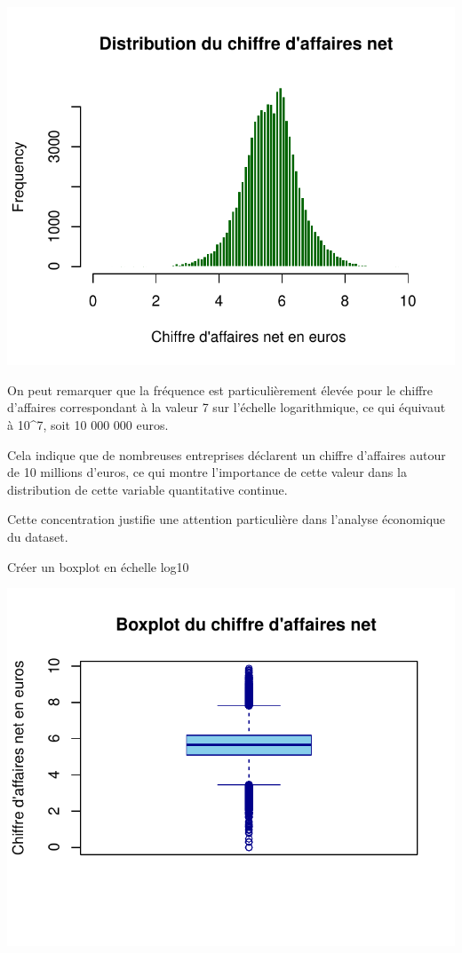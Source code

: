 \documentclass[mstat,12pt]{unswthesis}
\begin{document}
\medskip

\includegraphics{TDDT_projet_L_2_files/figure-latex/unnamed-chunk-40-1.pdf}

\medskip

On peut remarquer que la fréquence est particulièrement élevée pour le
chiffre d'affaires correspondant à la valeur 7 sur l'échelle
logarithmique, ce qui équivaut à 10\^{}7, soit 10 000 000 euros.

\medskip

Cela indique que de nombreuses entreprises déclarent un chiffre
d'affaires autour de 10 millions d'euros, ce qui montre l'importance de
cette valeur dans la distribution de cette variable quantitative
continue.

\medskip

Cette concentration justifie une attention particulière dans l'analyse
économique du dataset.

\medskip

Créer un boxplot en échelle log10

\medskip

\includegraphics{TDDT_projet_L_2_files/figure-latex/unnamed-chunk-41-1.pdf}
\end{document}
